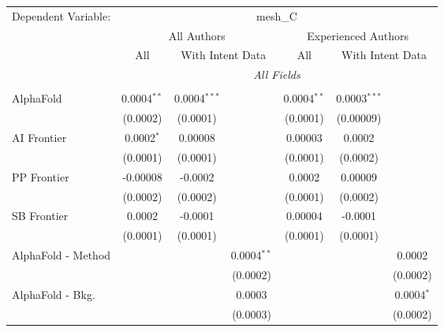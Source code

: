 \begingroup
\centering
\begin{tabular}{lcccccc}
   \tabularnewline \midrule \midrule
   Dependent Variable: & \multicolumn{6}{c}{mesh\_C}\\
 & \multicolumn{3}{c}{All Authors} & \multicolumn{3}{c}{Experienced Authors} \\
\cmidrule(lr){2-4} \cmidrule(lr){5-7}
 & \multicolumn{1}{c}{All} & \multicolumn{2}{c}{With Intent Data} & \multicolumn{1}{c}{All} & \multicolumn{2}{c}{With Intent Data} \\
\cmidrule(lr){2-2} \cmidrule(lr){3-4} \cmidrule(lr){5-5} \cmidrule(lr){6-7}
 & \multicolumn{6}{c}{\textit{All Fields}} \\ \\
   AlphaFold            & 0.0004$^{**}$ & 0.0004$^{***}$ &                 & 0.0004$^{**}$ & 0.0003$^{***}$ &   \\   
                        & (0.0002)      & (0.0001)       &                 & (0.0001)      & (0.00009)      &   \\   
   AI Frontier          & 0.0002$^{*}$  & 0.00008        &                 & 0.00003       & 0.0002         &   \\   
                        & (0.0001)      & (0.0001)       &                 & (0.0001)      & (0.0002)       &   \\   
   PP Frontier          & -0.00008      & -0.0002        &                 & 0.0002        & 0.00009        &   \\   
                        & (0.0002)      & (0.0002)       &                 & (0.0001)      & (0.0002)       &   \\   
   SB Frontier          & 0.0002        & -0.0001        &                 & 0.00004       & -0.0001        &   \\   
                        & (0.0001)      & (0.0001)       &                 & (0.0001)      & (0.0001)       &   \\   
   AlphaFold - Method   &               &                & 0.0004$^{**}$   &               &                & 0.0002\\   
                        &               &                & (0.0002)        &               &                & (0.0002)\\   
   AlphaFold - Bkg.     &               &                & 0.0003          &               &                & 0.0004$^{*}$\\   
                        &               &                & (0.0003)        &               &                & (0.0002)\\   

\end{tabular}
